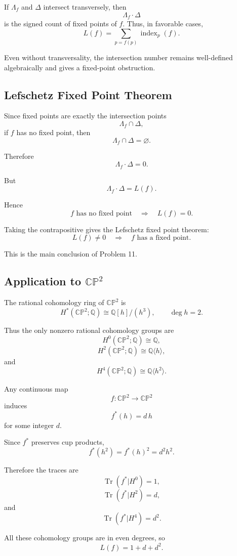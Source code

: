 \documentclass[12pt,a4paper]{article}
\theoremstyle{notespace}
\begin{document}
If \(\Lambda_f\) and \(\Delta\) intersect transversely, then
\[
\Lambda_f\cdot \Delta
\]
is the signed count of fixed points of \(f\). Thus, in favorable cases,
\[
L(f)=\sum_{p=f(p)} \operatorname{index}_p(f).
\]

Even without transversality, the intersection number remains well-defined
algebraically and gives a fixed-point obstruction.

\subsection{Lefschetz Fixed Point Theorem}

Since fixed points are exactly the intersection points
\[
\Lambda_f\cap \Delta,
\]
if \(f\) has no fixed point, then
\[
\Lambda_f\cap \Delta=\varnothing.
\]

Therefore
\[
\Lambda_f\cdot \Delta=0.
\]

But
\[
\Lambda_f\cdot \Delta=L(f).
\]

Hence
\[
f\text{ has no fixed point}
\quad\Longrightarrow\quad
L(f)=0.
\]

Taking the contrapositive gives the Lefschetz fixed point theorem:
\[
\boxed{
	L(f)\neq 0
	\quad\Longrightarrow\quad
	f\text{ has a fixed point}.
}
\]

This is the main conclusion of Problem 11.

\subsection{Application to \(\mathbb{CP}^2\)}

The rational cohomology ring of \(\mathbb{CP}^2\) is
\[
H^*(\mathbb{CP}^2;\mathbb Q)
\cong
\mathbb Q[h]/(h^3),
\qquad
\deg h=2.
\]

Thus the only nonzero rational cohomology groups are
\[
H^0(\mathbb{CP}^2;\mathbb Q)\cong \mathbb Q,
\]
\[
H^2(\mathbb{CP}^2;\mathbb Q)\cong \mathbb Q\langle h\rangle,
\]
and
\[
H^4(\mathbb{CP}^2;\mathbb Q)\cong \mathbb Q\langle h^2\rangle.
\]

Any continuous map
\[
f:\mathbb{CP}^2\to \mathbb{CP}^2
\]
induces
\[
f^*(h)=d\,h
\]
for some integer \(d\).

Since \(f^*\) preserves cup products,
\[
f^*(h^2)=f^*(h)^2=d^2h^2.
\]

Therefore the traces are
\[
\operatorname{Tr}(f^*|H^0)=1,
\]
\[
\operatorname{Tr}(f^*|H^2)=d,
\]
and
\[
\operatorname{Tr}(f^*|H^4)=d^2.
\]

All these cohomology groups are in even degrees, so
\[
L(f)=1+d+d^2.
\]
\end{document}
